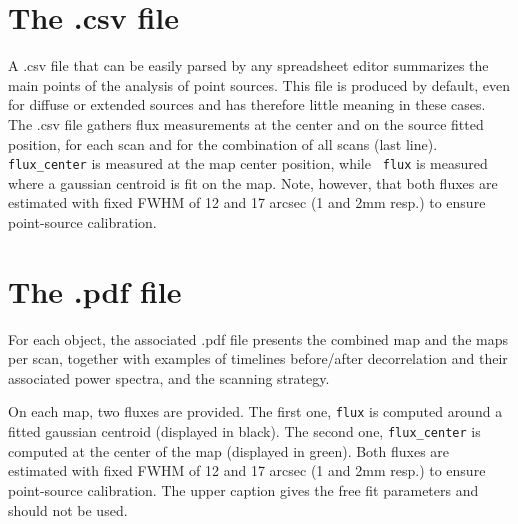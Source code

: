 \documentclass[a4paper,10pt]{article}
\begin{document}
\section{The .csv file}
A .csv file that can be easily parsed by any spreadsheet editor summarizes the
main points of the analysis of point sources. This file is produced by default,
even for diffuse or extended sources and has therefore little meaning in these
cases. The .csv file gathers flux measurements at the center and on the source
fitted position, for each scan and for the combination of all scans (last
line). {\tt flux\_center} is measured at the map center position, while {\tt
  flux} is measured where a gaussian centroid is fit on the map. Note, however,
that both fluxes are estimated with fixed FWHM of 12 and 17 arcsec (1 and 2mm
resp.) to ensure point-source calibration.

\section{The .pdf file}
For each object, the associated .pdf file presents the combined map and the maps per
scan, together with examples of timelines before/after decorrelation and their
associated power spectra, and the scanning strategy.

On each map, two fluxes are provided. The first one, {\tt flux} is computed
around a fitted gaussian centroid (displayed in black). The second one, {\tt flux\_center} is
computed at the center of the map (displayed in green). Both fluxes are estimated with fixed FWHM of
12 and 17 arcsec (1 and 2mm resp.) to ensure point-source calibration. The upper
caption gives the free fit parameters and should not be used.

 
\end{document}
